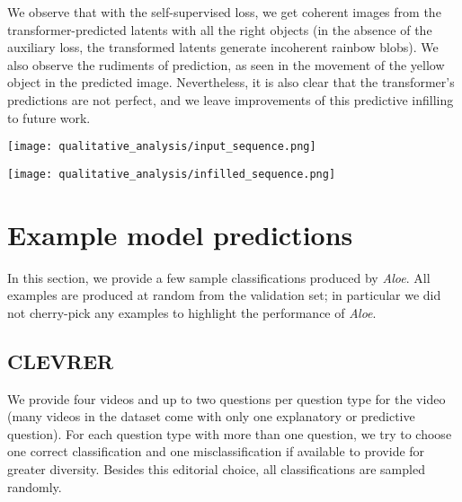 \documentclass{article}
\newcommand{\Model}{\emph{Aloe}}
\begin{document}
We observe that with the self-supervised loss, we get coherent images from the transformer-predicted latents with all the right objects
(in the absence of the auxiliary loss, the transformed latents generate incoherent rainbow blobs).
We also observe the rudiments of prediction, as seen in the movement of the yellow object in the predicted image.
Nevertheless, it is also clear that the transformer's predictions are not perfect, and we leave improvements of this predictive infilling
to future work.

\noindent\texttt{[image: qualitative\_analysis/input\_sequence.png]}

\noindent\texttt{[image: qualitative\_analysis/infilled\_sequence.png]}

\section{Example model predictions}
In this section, we provide a few sample classifications produced by \Model{}.
All examples are produced at random from the validation set;
in particular we did not cherry-pick any examples to highlight the performance of \Model{}.

\subsection{CLEVRER}
\label{appendix:clevrer_examples}
We provide four videos and up to two questions per question type for the video
(many videos in the dataset come with only one explanatory or predictive question).
For each question type with more than one question,
we try to choose
one correct classification and one misclassification if available
to provide for greater diversity.
Besides this editorial choice, all classifications are sampled randomly.
\end{document}
